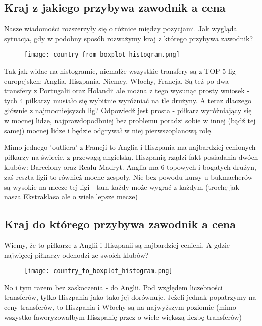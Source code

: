 \documentclass{article}
\begin{document}
\subsection{Kraj z jakiego przybywa zawodnik a cena}
Nasze wiadomości rozszerzyły się o różnice między pozycjami. Jak wygląda sytuacja, gdy w podobny sposób rozważymy kraj z którego przybywa zawodnik?

\begin{figure}[H]
    \centering
    \texttt{[image: country\_from\_boxplot\_histogram.png]}
\end{figure}

Tak jak widac na histogramie, niemalże wszystkie transfery są z TOP 5 lig europejskch: Anglia, Hiszpania, Niemcy, Włochy, Francja. Są też po dwa transfery z Portugalii oraz Holandii ale można z tego wysunąc prosty wniosek - tych 4 piłkarzy musiało się wybitnie wyróżniać na tle drużyny. A teraz dlaczego głównie z najmocniejsyzch lig? Odpowiedź jest prosta - piłkarz wyróżniający się w mocnej lidze, najprawdopodbniej bez problemu poradzi sobie w innej (bądź tej samej) mocnej lidze i będzie odgrywał w niej pierwszoplanową rolę.

Mimo jednego 'outliera' z Francji to Anglia i Hiszpania ma najbardziej cenionych piłkarzy na świecie, z przewagą angielską. Hiszpanią rządzi fakt posiadania dwóch klubów: Barcelony oraz Realu Madryt. Anglia ma 6 topowych i bogatych drużyn, zaś reszta ligii to również mocne zespoły. Nie bez powodu kursy u bukmacherów są wysokie na mecze tej ligi - tam każdy może wygrać z każdym (trochę jak nasza Ekstraklasa ale o wiele lepsze mecze)

\subsection{Kraj do którego przybywa zawodnik a cena}
Wiemy, że to piłkarze z Anglii i Hiszpanii są najbardziej cenieni. A gdzie najwięcej piłkarzy odchodzi ze swoich klubów?

\begin{figure}[H]
    \centering
    \texttt{[image: country\_to\_boxplot\_histogram.png]}
\end{figure}

No i tym razem bez zaskoczenia - do Anglii. Pod względem liczebności transferów, tylko Hiszpania jako tako jej dorównuje. Jeżeli jednak popatrzymy na ceny transferów, to Hiszpania i Włochy są na najwyższym poziomie (mimo wszystko faworyzowałbym Hiszpanię przez o wiele większą liczbę transferów)
\end{document}
